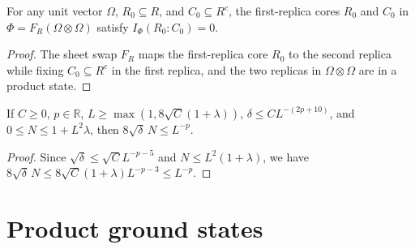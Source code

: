 \begin{lemma}
    \label{thm:peps_reset_exchanged_cores}
    \leanok
    For any unit vector $\Omega$, $R_0\subseteq R$, and $C_0\subseteq R^c$, the first-replica cores $R_0$ and $C_0$ in $\Phi=F_R(\Omega\otimes\Omega)$ satisfy $I_\Phi(R_0:C_0)=0$.
\end{lemma}
\begin{proof}
    \leanok
    The sheet swap $F_R$ maps the first-replica core $R_0$ to the second replica while fixing $C_0\subseteq R^c$ in the first replica, and the two replicas in $\Omega\otimes\Omega$ are in a product state.
\end{proof}

\begin{lemma}
    \label{thm:peps_reset_entropy_scalar}
    \leanok
    If $C\ge0$, $p\in\mathbb R$, $L\ge\max(1,8\sqrt C(1+\lambda))$, $\delta\le CL^{-(2p+10)}$, and $0\le N\le1+L^2\lambda$, then $8\sqrt\delta\,N\le L^{-p}$.
\end{lemma}
\begin{proof}
    \leanok
    Since $\sqrt\delta\le\sqrt CL^{-p-5}$ and $N\le L^2(1+\lambda)$, we have $8\sqrt\delta\,N\le8\sqrt C(1+\lambda)L^{-p-3}\le L^{-p}$.
\end{proof}

\section{Product ground states}

